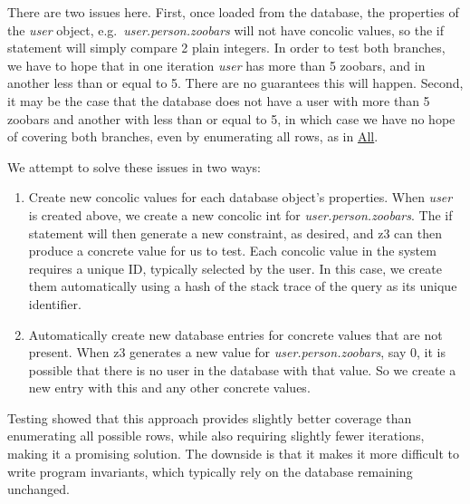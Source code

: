\documentclass{scrartcl}
\begin{document}
\begin{enumerate}
There are two issues here. First, once loaded from the database, the properties
of the \textit{user} object, e.g.\ \textit{user.person.zoobars} will not have
concolic values, so the if statement will simply compare 2
plain integers. In order to test both branches, we have to hope that
in one iteration \textit{user} has more than 5 zoobars, and in another less than
or equal to 5. There are no guarantees this will happen. Second, it may be the
case that the database does not have a user with more than 5 zoobars and another
with less than or equal to 5, in which case we have no
hope of covering both branches, even by enumerating all rows, as in
\underline{All}.

We attempt to solve these issues in two ways:
\begin{enumerate}
  \item Create new concolic values for each database object's properties. When
    \textit{user} is created above, we create a new concolic int for
    \textit{user.person.zoobars}. The if statement will then generate a
    new constraint, as desired, and z3 can then produce a concrete value for us
    to test. Each concolic value in the system requires a unique ID, typically
    selected by the user. In this case, we create them automatically using a
    hash of the
    stack trace of the query as its unique identifier.
  \item Automatically create new database entries for concrete values that are
    not present. When z3 generates a new value for \textit{user.person.zoobars},
    say 0, it is possible that there is no user in the database with that value.
    So we create a new entry with this and any other concrete values.
\end{enumerate}


Testing showed that this approach provides slightly better coverage than enumerating all possible
rows, while also requiring slightly fewer iterations, making it a promising
solution. The downside is that it makes it more difficult to write program
invariants, which typically rely on the database remaining unchanged.

\end{enumerate}
\end{document}
